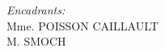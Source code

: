 \begin{titlepage}
\begin{sffamily}
\begin{center}
\begin{minipage}{0.4\textwidth}
\begin{flushleft}
        \emph{}
      \end{flushleft}
    \end{minipage}
    \begin{minipage}{0.4\textwidth}
      \begin{flushright} \large
        \emph{Encadrants:}\\
Mme. \textsc{POISSON CAILLAULT}\\
M. \textsc{SMOCH}

        \emph{}
      \end{flushright}
    \end{minipage}

    \vfill
  \end{center}
  \end{sffamily}
\end{titlepage}
